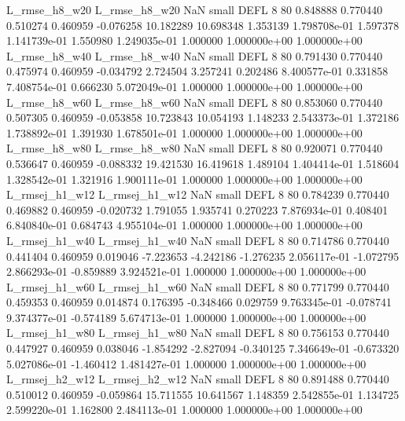  L_rmse_h8_w20  L_rmse_h8_w20                   NaN      small     DEFL                 8 80 0.848888       0.770440 0.510274       0.460959   -0.076258     10.182289     10.698348     1.353139   1.798708e-01  1.597378 1.141739e-01     1.550980   1.249035e-01            1.000000    1.000000e+00        1.000000e+00
 L_rmse_h8_w40  L_rmse_h8_w40                   NaN      small     DEFL                 8 80 0.791430       0.770440 0.475974       0.460959   -0.034792      2.724504      3.257241     0.202486   8.400577e-01  0.331858 7.408754e-01     0.666230   5.072049e-01            1.000000    1.000000e+00        1.000000e+00
 L_rmse_h8_w60  L_rmse_h8_w60                   NaN      small     DEFL                 8 80 0.853060       0.770440 0.507305       0.460959   -0.053858     10.723843     10.054193     1.148233   2.543373e-01  1.372186 1.738892e-01     1.391930   1.678501e-01            1.000000    1.000000e+00        1.000000e+00
 L_rmse_h8_w80  L_rmse_h8_w80                   NaN      small     DEFL                 8 80 0.920071       0.770440 0.536647       0.460959   -0.088332     19.421530     16.419618     1.489104   1.404414e-01  1.518604 1.328542e-01     1.321916   1.900111e-01            1.000000    1.000000e+00        1.000000e+00
L_rmsej_h1_w12 L_rmsej_h1_w12                   NaN      small     DEFL                 8 80 0.784239       0.770440 0.469882       0.460959   -0.020732      1.791055      1.935741     0.270223   7.876934e-01  0.408401 6.840840e-01     0.684743   4.955104e-01            1.000000    1.000000e+00        1.000000e+00
L_rmsej_h1_w40 L_rmsej_h1_w40                   NaN      small     DEFL                 8 80 0.714786       0.770440 0.441404       0.460959    0.019046     -7.223653     -4.242186    -1.276235   2.056117e-01 -1.072795 2.866293e-01    -0.859889   3.924521e-01            1.000000    1.000000e+00        1.000000e+00
L_rmsej_h1_w60 L_rmsej_h1_w60                   NaN      small     DEFL                 8 80 0.771799       0.770440 0.459353       0.460959    0.014874      0.176395     -0.348466     0.029759   9.763345e-01 -0.078741 9.374377e-01    -0.574189   5.674713e-01            1.000000    1.000000e+00        1.000000e+00
L_rmsej_h1_w80 L_rmsej_h1_w80                   NaN      small     DEFL                 8 80 0.756153       0.770440 0.447927       0.460959    0.038046     -1.854292     -2.827094    -0.340125   7.346649e-01 -0.673320 5.027086e-01    -1.460412   1.481427e-01            1.000000    1.000000e+00        1.000000e+00
L_rmsej_h2_w12 L_rmsej_h2_w12                   NaN      small     DEFL                 8 80 0.891488       0.770440 0.510012       0.460959   -0.059864     15.711555     10.641567     1.148359   2.542855e-01  1.134725 2.599220e-01     1.162800   2.484113e-01            1.000000    1.000000e+00        1.000000e+00
